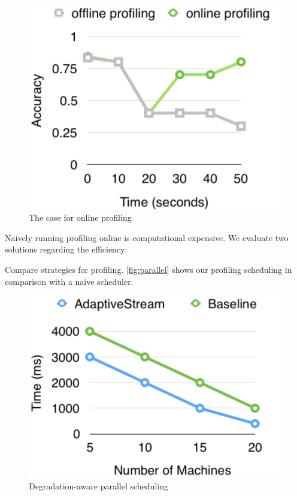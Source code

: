\begin{figure}
  \centering
  \includegraphics[width=\columnwidth]{figures/offline-online-profiling.pdf}
  \caption{The case for online profiling}
  \label{fig:online-profiling-comparison}
\end{figure}

Naively running profiling online is computational expensive. We evaluate two
solutions regarding the efficiency:

 Compare strategies for profiling.
\autoref{fig:parallel} shows our profiling scheduling in comparison with a naive
scheduler.

\begin{figure}
  \centering
  \includegraphics[width=\columnwidth]{figures/parallel-placeholder.pdf}
  \caption{Degradation-aware parallel scheduling}
  \label{fig:parallel}
\end{figure}

